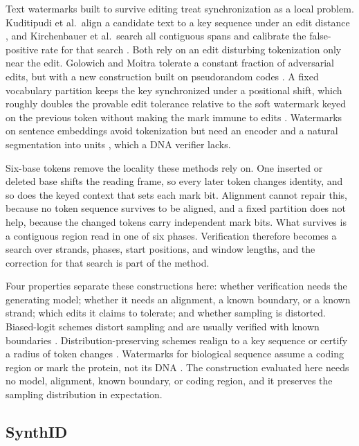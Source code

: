 \documentclass[10pt,twocolumn]{article}
\begin{document}
Text watermarks built to survive editing treat synchronization as a local problem. Kuditipudi
et al.\ align a candidate text to a key sequence under an edit distance
\cite{kuditipudi2024robust}, and Kirchenbauer et al.\ search all contiguous spans and calibrate the
false-positive rate for that search \cite{kirchenbauer2024reliability}. Both rely on an edit
disturbing tokenization only near the edit. Golowich and Moitra tolerate a constant fraction of
adversarial edits, but with a new construction built on pseudorandom codes
\cite{golowich2024edit}. A fixed vocabulary partition keeps the key synchronized under a positional
shift, which roughly doubles the provable edit tolerance relative to the soft watermark keyed on
the previous token without making the mark immune to edits \cite{zhao2024provable}. Watermarks on
sentence embeddings avoid tokenization but need an encoder and a natural segmentation into units
\cite{hou2024semstamp}, which a DNA verifier lacks.

Six-base tokens remove the locality these methods rely on. One inserted or deleted base shifts the
reading frame, so every later token changes identity, and so does the keyed context that sets each
mark bit. Alignment cannot repair this, because no token sequence survives to be aligned, and a
fixed partition does not help, because the changed tokens carry independent mark bits. What
survives is a contiguous region read in one of six phases. Verification therefore becomes a search
over strands, phases, start positions, and window lengths, and the correction for that search is
part of the method.

Four properties separate these constructions here: whether verification needs the generating
model; whether it needs an alignment, a known boundary, or a known strand; which edits it claims to
tolerate; and whether sampling is distorted. Biased-logit schemes distort sampling and are usually
verified with known boundaries \cite{kirchenbauer2023watermark}. Distribution-preserving schemes
realign to a key sequence \cite{kuditipudi2024robust} or certify a radius of token changes
\cite{wu2024dipmark}. Watermarks for biological sequence assume a coding region
\cite{zhang2025securing} or mark the protein, not its DNA \cite{chen2025protein}. The construction evaluated here needs no model, alignment, known boundary, or coding region, and it
preserves the sampling distribution in expectation.

\subsection{SynthID}
\end{document}
